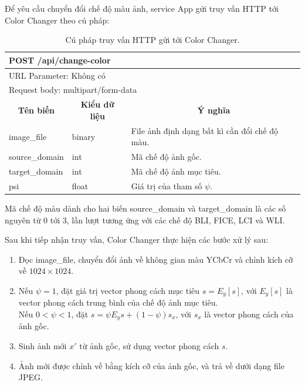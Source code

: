 \documentclass[12pt]{extreport}
\begin{document}
Để yêu cầu chuyển đổi chế độ màu ảnh, service App gửi truy vấn HTTP tới Color Changer theo cú pháp:
\begin{table}[H]
    \centering
    \begin{tabular}{l l l}
        \multicolumn{3}{l}{POST /api/change-color}                                                                                        \\
        \hline
        \multicolumn{3}{l}{URL Parameter: Không có}                                                                                       \\
        \hline
        \multicolumn{3}{l}{Request body: multipart/form-data}                                                                             \\
        \hline
        \multicolumn{1}{c}{\textbf{Tên biến}} & \multicolumn{1}{c}{\textbf{Kiểu dữ liệu}} & \multicolumn{1}{c}{\textbf{Ý nghĩa}}          \\
        \hline
        image\_file                           & binary                                    & File ảnh định dạng bất kì cần đổi chế độ màu. \\
        source\_domain                        & int                                       & Mã chế độ ảnh gốc.                            \\
        target\_domain                        & int                                       & Mã chế độ ảnh mục tiêu.                       \\
        psi                                   & float                                     & Giá trị của tham số $ \psi $.
    \end{tabular}
    \caption{Cú pháp truy vấn HTTP gửi tới Color Changer.}
\end{table}

Mã chế độ màu dành cho hai biến source\_domain và target\_domain là các số nguyên từ 0 tới 3, lần lượt tương ứng với các chế độ BLI, FICE, LCI và WLI.

Sau khi tiếp nhận truy vấn, Color Changer thực hiện các bước xử lý sau:
\begin{enumerate}
    \item Đọc image\_file, chuyển đổi ảnh về không gian màu YCbCr và chỉnh kích cỡ về $ 1024 \times 1024 $.
    \item Nếu $ \psi = 1 $, đặt giá trị vector phong cách mục tiêu $ s = E_y [s] $, với $ E_y [s] $ là vector phong cách trung bình của chế độ ảnh mục tiêu.\\ Nếu $ 0 < \psi < 1 $, đặt $ s = \psi E_y{s} + (1 - \psi) s_x $, với $ s_x $ là vector phong cách của ảnh gốc.
    \item Sinh ảnh mới $ x' $ từ ảnh gốc, sử dụng vector phong cách $ s $.
    \item Ảnh mới được chỉnh về bằng kích cỡ của ảnh gốc, và trả về dưới dạng file JPEG.
\end{enumerate}
\end{document}
